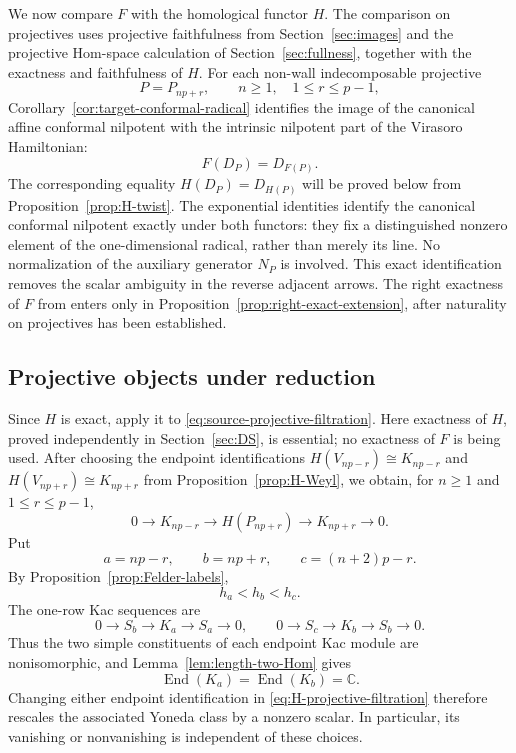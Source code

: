 \documentclass[12pt,leqno]{amsart}
\numberwithin{equation}{section}
\newcommand{\End}{\operatorname{End}}
\def\C{\mathbb{C}}
\begin{document}
We now compare $F$ with the homological functor $H$.  The comparison on
projectives uses projective faithfulness from Section~\ref{sec:images} and
the projective Hom-space calculation of Section~\ref{sec:fullness},
together with the exactness and faithfulness of $H$.  For each non-wall
indecomposable projective
\[
 P=P_{np+r},\qquad n\ge1,\quad1\le r\le p-1,
\]
Corollary~\ref{cor:target-conformal-radical} identifies the image of the
canonical affine conformal nilpotent with the intrinsic nilpotent part of
the Virasoro Hamiltonian:
\[
 F(D_P)=D_{F(P)}.
\]
The corresponding equality $H(D_P)=D_{H(P)}$ will be proved below from
Proposition~\ref{prop:H-twist}.  The exponential identities identify the
canonical conformal nilpotent exactly under both functors: they fix a
distinguished nonzero element of the one-dimensional radical, rather than
merely its line.  No normalization of the auxiliary generator $N_P$ is
involved.  This exact identification removes the scalar ambiguity in the
reverse adjacent arrows.  The right exactness of $F$ from
\cite[Theorem~7.15]{McRaeYang} enters only in
Proposition~\ref{prop:right-exact-extension}, after naturality on
projectives has been established.

\subsection{Projective objects under reduction}

Since $H$ is exact, apply it to \eqref{eq:source-projective-filtration}.
Here exactness of $H$, proved independently in Section~\ref{sec:DS}, is
essential; no exactness of $F$ is being used.
After choosing the endpoint identifications
$H(V_{np-r})\cong K_{np-r}$ and $H(V_{np+r})\cong K_{np+r}$ from
Proposition~\ref{prop:H-Weyl}, we obtain, for $n\ge1$ and
$1\le r\le p-1$,
\begin{equation}\label{eq:H-projective-filtration}
 0\longrightarrow K_{np-r}\longrightarrow H(P_{np+r})
 \longrightarrow K_{np+r}\longrightarrow0.
\end{equation}
Put
\[
 a=np-r,\qquad b=np+r,\qquad c=(n+2)p-r.
\]
By Proposition~\ref{prop:Felder-labels},
\[
 h_a<h_b<h_c.
\]
The one-row Kac sequences are
\[
 0\longrightarrow S_b\longrightarrow K_a\longrightarrow S_a
 \longrightarrow0,
 \qquad
 0\longrightarrow S_c\longrightarrow K_b\longrightarrow S_b
 \longrightarrow0.
\]
Thus the two simple constituents of each endpoint Kac module are
nonisomorphic, and Lemma~\ref{lem:length-two-Hom} gives
\[
 \End(K_a)=\End(K_b)=\C.
\]
Changing either endpoint identification in
\eqref{eq:H-projective-filtration} therefore rescales the associated
Yoneda class by a nonzero scalar.  In particular, its vanishing or
nonvanishing is independent of these choices.
\end{document}
